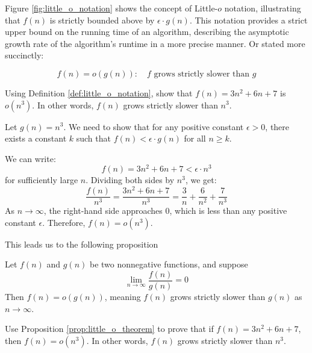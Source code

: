 Figure \ref{fig:little_o_notation} shows the concept of Little-$o$ notation, illustrating that $f(n)$ is strictly bounded above by $\epsilon \cdot g(n)$. This notation provides a strict upper bound on the running time of an algorithm, describing the asymptotic growth rate of the algorithm's runtime in a more precise manner. Or stated more succinctly:

\[
f(n)=o(g(n)): \quad f \text{ grows strictly slower than } g
\]

\begin{example}
    Using Definition \ref{def:little_o_notation}, show that $f(n)=3n^2+6n+7$ is $o(n^3)$. In other words, $f(n)$ grows strictly slower than $n^3$.
\end{example}

\begin{solution}
    Let $g(n) = n^3$. We need to show that for any positive constant $\epsilon > 0$, there exists a constant $k$ such that $f(n) < \epsilon \cdot g(n)$ for all $n \geq k$.

    We can write:
    \[
    f(n) = 3n^2 + 6n + 7 < \epsilon \cdot n^3
    \]
    for sufficiently large $n$. Dividing both sides by $n^3$, we get:
    \[
    \frac{f(n)}{n^3} = \frac{3n^2 + 6n + 7}{n^3} = \frac{3}{n} + \frac{6}{n^2} + \frac{7}{n^3}
    \]
    As $n \to \infty$, the right-hand side approaches $0$, which is less than any positive constant $\epsilon$. Therefore, $f(n) = o(n^3)$.
\end{solution}

This leads us to the following proposition

\begin{proposition} \label{prop:little_o_theorem}
    Let \( f(n) \) and \( g(n) \) be two nonnegative functions, and suppose
    \medskip
    \[
    \lim_{n \rightarrow \infty} \frac{f(n)}{g(n)} = 0
    \]
    \medskip
    Then \( f(n) = o(g(n)) \), meaning \( f(n) \) grows strictly slower than \( g(n) \) as \( n \to \infty \).
\end{proposition}

\begin{example}
    Use Proposition \ref{prop:little_o_theorem} to prove that if \( f(n) = 3n^2 + 6n + 7 \), then \( f(n) = o(n^3) \). In other words, \( f(n) \) grows strictly slower than \( n^3 \).

\end{example}

